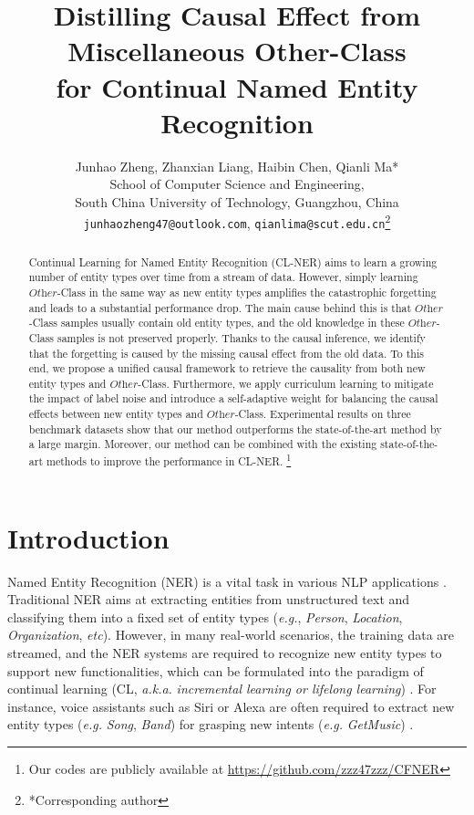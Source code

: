 \documentclass[11pt]{article}
\title{Distilling Causal Effect from Miscellaneous Other-Class\\ for Continual Named Entity Recognition}
\author{Junhao Zheng, Zhanxian Liang, Haibin Chen, Qianli Ma*\\
  School of Computer Science and Engineering, \\
  South China University of Technology, Guangzhou, China\\
  \texttt{junhaozheng47@outlook.com}, 
  \texttt{qianlima@scut.edu.cn}\thanks{*Corresponding author}}
\begin{document}
\maketitle
\begin{abstract}
Continual Learning for Named Entity Recognition (CL-NER) aims to learn a growing number of entity types over time from a stream of data.
However, simply learning $\textit{Other}$-Class in the same way as new entity types amplifies the catastrophic forgetting and leads to a substantial performance drop.
The main cause behind this is that $\textit{Other}$-Class samples usually contain old entity types, and the old knowledge in these $\textit{Other}$-Class samples is not preserved properly.
Thanks to the causal inference, we identify that the forgetting is caused by the missing causal effect from the old data.
To this end, we propose a unified causal framework to retrieve the causality from both new entity types and $\textit{Other}$-Class.
Furthermore, we apply curriculum learning to mitigate the impact of label noise and introduce a self-adaptive weight for balancing the causal effects between new entity types and $\textit{Other}$-Class.
Experimental results on three benchmark datasets show that our method outperforms the state-of-the-art method by a large margin.
Moreover, our method can be combined with the existing state-of-the-art methods to improve the performance in CL-NER. \footnote{Our codes are publicly available at \href{https://github.com/zzz47zzz/CFNER}{https://github.com/zzz47zzz/CFNER}}
\end{abstract}

\section{Introduction}
Named Entity Recognition (NER) is a vital task in various NLP applications \citep{ma2016end}.
Traditional NER aims at extracting entities from unstructured text and classifying them into a fixed set of entity types (\textit{e.g.}, \textit{Person}, \textit{Location}, \textit{Organization}, \textit{etc}).
However, in many real-world scenarios, the training data are streamed, and the NER systems are required to recognize new entity types to support new functionalities, which can be formulated into the paradigm of continual learning  (CL, \textit{a.k.a.} \textit{incremental learning or lifelong learning}) \citep{thrun1998lifelong,parisi2019continual}.
For instance, voice assistants such as Siri or Alexa are often required to extract new entity types (\textit{e.g.} \textit{Song}, \textit{Band}) for grasping new intents (\textit{e.g.} \textit{GetMusic}) \citep{monaikul2021continual}.
\end{document}
